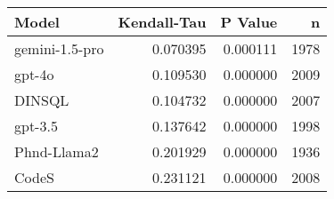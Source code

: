 \begin{tabular}{lrrr}
\toprule
Model & Kendall-Tau & P Value & n \\
\midrule
gemini-1.5-pro & 0.070395 & 0.000111 & 1978 \\
gpt-4o & 0.109530 & 0.000000 & 2009 \\
DINSQL & 0.104732 & 0.000000 & 2007 \\
gpt-3.5 & 0.137642 & 0.000000 & 1998 \\
Phnd-Llama2 & 0.201929 & 0.000000 & 1936 \\
CodeS & 0.231121 & 0.000000 & 2008 \\
\bottomrule
\end{tabular}
